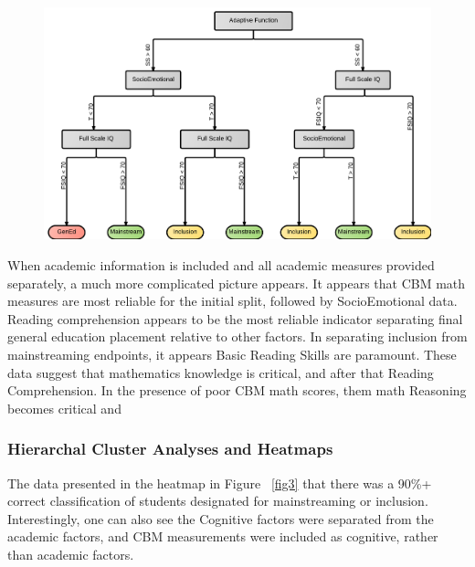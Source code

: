 \documentclass[twoside]{article}
\begin{document}
%
%
%
%
\begin{figure}[htp!]
	\centering
	\includegraphics[width=\textwidth]{RegressionTree_NOAcademics.png}
	\caption[Mainstreaming Decision Tree]{\textit{          }}
	\label{fig2}
\end{figure}
%
%
%
%
When academic information is included and all academic measures provided separately, a much more complicated picture appears. It appears that CBM math measures are most reliable for the initial split, followed by SocioEmotional data. Reading comprehension appears to be the most reliable indicator separating final general education placement relative to other factors. In separating inclusion from mainstreaming endpoints, it appears Basic Reading Skills are paramount. These data suggest that mathematics knowledge is critical, and after that Reading Comprehension. In the presence of poor CBM math scores, them math Reasoning becomes critical and  


\subsubsection{Hierarchal Cluster Analyses and Heatmaps}

The data presented in the heatmap in Figure ~\ref{fig3} that there was a 90\%+ correct classification of students designated for mainstreaming or inclusion. Interestingly, one can also see the Cognitive factors were separated from the academic factors, and CBM measurements were included as cognitive, rather than academic factors. 
\end{document}
